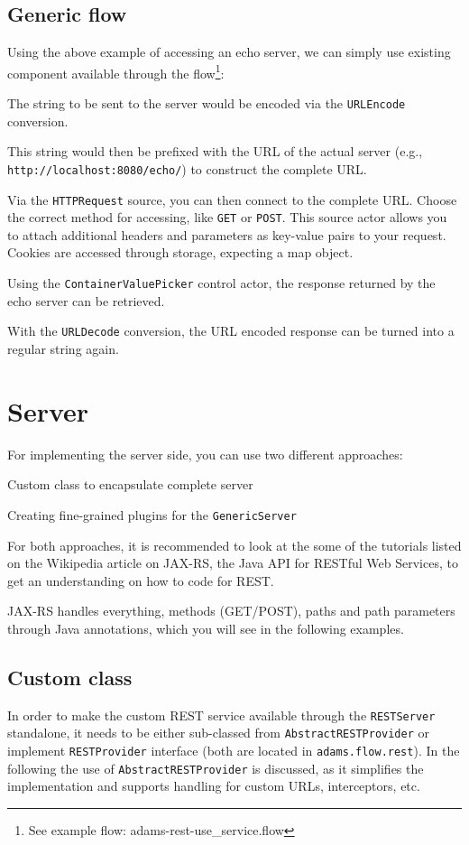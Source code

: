 \documentclass[a4paper]{book}
\begin{document}
\subsection{Generic flow}
Using the above example of accessing an echo server, we can simply use existing
component available through the flow\footnote{See example flow: adams-rest-use\_service.flow}:
\begin{tight_itemize}
  \item The string to be sent to the server would be encoded via the \verb|URLEncode|
  conversion.
  \item This string would then be prefixed with the URL of the actual server
  (e.g., \verb|http://localhost:8080/echo/|) to construct the complete URL.
  \item Via the \verb|HTTPRequest| source, you can then connect to the
  complete URL. Choose the correct method for accessing, like \verb|GET|
  or \verb|POST|. This source actor allows you to attach additional headers and
  parameters as key-value pairs to your request. Cookies are accessed through
  storage, expecting a map object.
  \item Using the \verb|ContainerValuePicker| control actor, the response
  returned by the echo server can be retrieved.
  \item With the \verb|URLDecode| conversion, the URL encoded response can
  be turned into a regular string again.
\end{tight_itemize}


\clearpage
\section{Server}
For implementing the server side, you can use two different approaches:
\begin{tight_itemize}
  \item Custom class to encapsulate complete server
  \item Creating fine-grained plugins for the \verb|GenericServer|
\end{tight_itemize}
For both approaches, it is recommended to look at the some of the tutorials
listed on the Wikipedia article on JAX-RS\cite{jax-rs}, the Java API for
RESTful Web Services, to get an understanding on how to code for REST.

JAX-RS handles everything, methods (GET/POST), paths and path parameters through
Java annotations, which you will see in the following examples.

\subsection{Custom class}
In order to make the custom REST service available through the \verb|RESTServer|
standalone, it needs to be either sub-classed from \verb|AbstractRESTProvider|
or implement \verb|RESTProvider| interface (both are located in
\verb|adams.flow.rest|). In the following the use of \verb|AbstractRESTProvider|
is discussed, as it simplifies the implementation and supports handling for
custom URLs, interceptors, etc.
\end{document}
